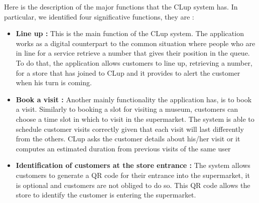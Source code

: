 Here is the description of the major functions that the CLup system has. In particular, we identified four significative functions, they are :
\begin{itemize}
    \item \textbf{Line up :} This is the main function of the CLup system. The application works as a digital counterpart to the common situation where people who are in line for a service retrieve a number that gives their position in the queue. \newline To do that, the application allows customers to line up, retrieving a number, for a store that has joined to CLup and it provides to alert the customer when his turn is coming.
    \item \textbf{Book a visit :} Another mainly functionality the application has, is to book a visit. Similarly to booking a slot for visiting a museum, customers can choose a time slot in which to visit in the supermarket. The system is able to schedule customer visits correctly given that each visit will last differently from the others. CLup asks the customer details about his/her visit or it computes an estimated duration from previous visits of the same user
    \item \textbf{Identification of customers at the store entrance :} The system allows customers to generate a QR code for their entrance into the supermarket, it is optional and customers are not obliged to do so. This QR code allows the store to identify the customer is entering the supermarket.
\end{itemize}